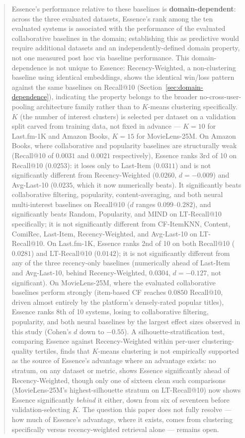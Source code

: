 \documentclass[11pt,a4paper]{article}
\begin{document}
\begin{abstract}
Essence's performance relative to these baselines is \textbf{domain-dependent}:
across the three evaluated datasets, Essence's rank among the ten evaluated
systems is associated with the performance of the evaluated collaborative
baselines in the domain; establishing this as predictive would require
additional datasets and an independently-defined domain property, not one
measured post hoc via baseline performance. This domain-dependence is not
unique to Essence: Recency-Weighted, a non-clustering baseline using
identical embeddings, shows the identical win/loss pattern against the same
baselines on Recall@10 (Section~\ref{sec:domain-dependence}), indicating the
property belongs to the broader no-cross-user-pooling architecture family
rather than to $K$-means clustering specifically. $K$ (the number
of interest clusters) is selected per dataset on a validation split
carved from training data, not fixed in advance --- $K=10$ for Last.fm-1K
and Amazon Books, $K=15$ for MovieLens-25M. On Amazon Books, where
collaborative and popularity baselines are structurally weak (Recall@10 of
$0.0031$ and $0.0021$ respectively), Essence ranks 3rd of 10 on Recall@10
($0.0253$): it loses only to Last-Item ($0.0311$) and is not
significantly different from Recency-Weighted ($0.0260$,
$d=-0.009$) and Avg-Last-10 ($0.0235$, which it now numerically beats). It
significantly beats collaborative filtering, popularity, content-averaging,
and both neural multi-interest baselines on Recall@10 ($d$ ranges
$0.099$--$0.282$), and significantly beats Random, Popularity, and MIND on
LT-Recall@10 specifically; it is not significantly different from CF-ItemKNN,
Content, ComiRec, Last-Item, Recency-Weighted, and Avg-Last-10 on
LT-Recall@10. On Last.fm-1K, Essence ranks 2nd of 10 on both Recall@10
($0.0281$) and LT-Recall@10 ($0.0142$); it is not significantly different
from any of the three recency-only baselines (numerically ahead of
Last-Item and Avg-Last-10, behind Recency-Weighted, $0.0304$, $d=-0.127$,
not significant).
On MovieLens-25M, where the evaluated collaborative baselines perform strongly (item-based CF
reaches $0.0850$ Recall@10, driven almost entirely by the platform's
densely-rated popular titles), Essence ranks 8th of 10 systems, losing to
collaborative filtering, popularity, and both neural baselines by the
largest effect sizes observed in this study (Cohen's $d$ down to $-0.55$).
A silhouette-stratification test, comparing Essence against
Recency-Weighted within per-user clustering-quality tertiles, finds that
$K$-means clustering is not empirically supported as the source of
Essence's advantage where an advantage exists: no stratum, on any dataset
or metric, shows Essence significantly ahead of Recency-Weighted, though
only one of sixteen clean such comparisons (MovieLens-25M's highest-silhouette
stratum on LT-Recall@10) now shows Essence significantly \emph{behind} it
either, down from six of seventeen before validation-selecting $K$. The question this
paper does not fully resolve --- how much of Essence's advantage, where it
exists, comes from clustering specifically versus recency-weighted
retrieval alone --- remains open.


\end{abstract}
\end{document}
